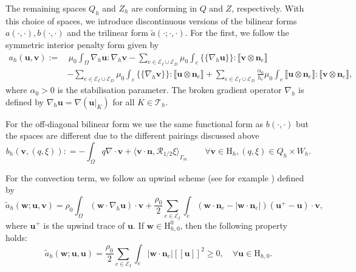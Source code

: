 \documentclass[onefignum,onetabnum,reqno,a4paper,final]{siamart250211}
\def\O{\Omega}
\newcommand{\jump}[1]{\llbracket #1 \rrbracket}
\newcommand{\mean}[1]{\{\!\!\{#1\}\!\!\}}
\newcommand\bu{\boldsymbol{u}}
\newcommand\bv{\boldsymbol{v}}
\newcommand\bn{\boldsymbol{n}}
\newcommand\bw{\boldsymbol{w}}
\newcommand\0{\mathbf{0}}
\newcommand\CE{\mathcal{E}}
\def\CT{{\mathcal T}}
\newcommand\bH{\boldsymbol{\mathrm{H}}}
\renewcommand\O{\Omega}
\numberwithin{figure}{section}
\numberwithin{table}{section}
\begin{document}
	The remaining spaces $Q_h$ and $Z_h$ are conforming in $Q$ and $Z$, respectively. 
	With this choice of spaces, we introduce  discontinuous versions of the bilinear forms $a(\cdot,\cdot),b(\cdot,\cdot)$ and the trilinear form $\widetilde{a}(\cdot;\cdot,\cdot)$. For the first, we follow the symmetric interior penalty form given by 
	\begin{equation}
		\label{eq:bilinear_form_ah}
		\begin{aligned}
			a_h(\bu,\bv):=&\,\mu_0\int_{\O}\nabla_h\bu:\nabla_h\bv - \sum_{e\in\mathcal{E}_I \cup \CE_D}\mu_0\int_e\mean{\nabla_h\bu } :\jump{\bv\otimes\bn_e}\\
			&-\sum_{e\in\mathcal{E}_I \cup \CE_D}\mu_0\int_e\mean{\nabla_h\bv } :\jump{\bu\otimes\bn_e} + \sum_{e\in\mathcal{E}_I \cup \CE_D}\frac{\alpha_0}{h_e}\mu_0\int_e\jump{\bu\otimes\bn_e} :\jump{\bv\otimes\bn_e},
		\end{aligned}
	\end{equation}
	where $\alpha_0>0$ is the stabilisation parameter. The broken gradient operator $\nabla_h$ is defined by $\nabla_h\bu =\nabla (\bu\vert_K)$ for all $K\in\CT_h$.
	
	For the off-diagonal bilinear form we use the same functional form as $b(\cdot,\cdot)$ but the spaces are different due to the different pairings discussed above 
	\begin{equation}\label{eq:bh}
 b_h(\bv,(q,\xi)) : = -\int_\Omega q \nabla\cdot\bv+
{\langle \bv\cdot\bn,\mathcal{R}_{1/2}\xi\rangle}_{\Gamma_{m}}
 \qquad \forall \bv\in \bH_h,(q,\xi)\in Q_h\times W_h.\end{equation}
	
	For the convection term, we follow an upwind scheme (see for example \cite{buerger2019h})  defined by
	\begin{equation}
		\widetilde{a}_h(\bw;\bu,\bv)=\rho_0\int_\Omega (\bw\cdot\nabla_h\bu)\cdot\bv+ \frac{\rho_0}{2}\sum_{e \in \CE_I}\int_{ e} (\bw\cdot\bn_e - |\bw\cdot\bn_e|)(\bu^+ - \bu)\cdot\bv, \label{eq:upwind}
	\end{equation}
	where $\bu^+$ is the upwind trace of $\bu$. If $\bw\in \bH_{h,0}^0$, then the following property holds:
 $$
\widetilde{a}_h(\bw;\bu,\bu) = \frac{\rho_0}{2}\sum_{e \in \CE_I}\int_{ e}  |\bw\cdot\bn_e|[\![\bu]\!]^2 \ge 0, \quad \forall \bu\in\bH_{h,0}.
 $$
 
\end{document}

